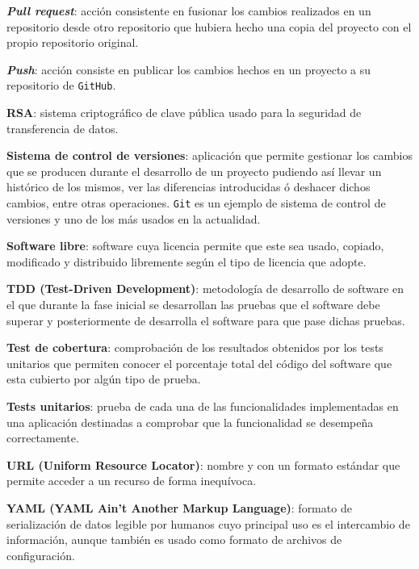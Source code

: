 \textbf{\textit{Pull request}}: acción consistente en fusionar los cambios realizados en un repositorio desde otro repositorio que hubiera hecho una copia del proyecto con el propio repositorio original.
\bigskip

\textbf{\textit{Push}}: acción consiste en publicar los cambios hechos en un proyecto a su repositorio de {\tt GitHub}.
\bigskip

\textbf{RSA}: sistema criptográfico de clave pública usado para la seguridad de transferencia de datos.
\bigskip

\textbf{Sistema de control de versiones}: aplicación que permite gestionar los cambios que se producen durante el desarrollo de un proyecto pudiendo así llevar un histórico de los mismos, ver las diferencias introducidas ó deshacer dichos cambios, entre otras operaciones. {\tt Git} es un ejemplo de sistema de control de versiones y uno de los más usados en la actualidad.
\bigskip

\textbf{Software libre}: software cuya licencia permite que este sea usado, copiado, modificado y distribuido libremente según el tipo de licencia que adopte.
\bigskip

\textbf{TDD (Test-Driven Development)}: metodología de desarrollo de software en el que durante la fase inicial se desarrollan las pruebas que el software debe superar y posteriormente de desarrolla el software para que pase dichas pruebas.
\bigskip

\textbf{Test de cobertura}: comprobación de los resultados obtenidos por los tests unitarios que permiten conocer el porcentaje total del código del software que esta cubierto por algún tipo de prueba.
\bigskip

\textbf{Tests unitarios}: prueba de cada una de las funcionalidades implementadas en una aplicación destinadas a comprobar que la funcionalidad se desempeña correctamente.
\bigskip

\textbf{URL (Uniform Resource Locator)}: nombre y con un formato estándar que permite acceder a un recurso de forma inequívoca.
\bigskip

\textbf{YAML (YAML Ain't Another Markup Language)}: formato de serialización de datos legible por humanos cuyo principal uso es el intercambio de información, aunque también es usado como formato de archivos de configuración.